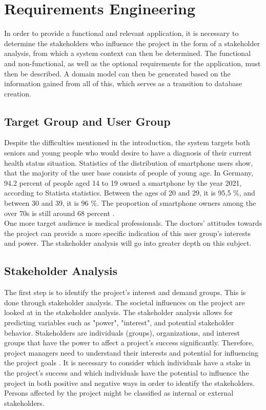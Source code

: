 
\chapter{Requirements Engineering}
In order to provide a functional and relevant application, it is necessary to determine the stakeholders who influence the project in the form of a stakeholder analysis, from which a system context can then be determined. The functional and non-functional, as well as the optional requirements for the application, must then be described. A domain model can then be generated based on the information gained from all of this, which serves as a transition to database creation.

\section{Target Group and User Group}
Despite the difficulties mentioned in the introduction, the system targets both seniors and young people who would desire to have a diagnosis of their current health status situation. Statistics of the distribution of smartphone users show, that the majority of the user base consists of people of young age. In Germany, 94.2 percent of people aged 14 to 19 owned a smartphone by the year 2021, according to Statista statistics. Between the ages of 20 and 29, it is 95,5 \%, and between 30 and 39, it is 96 \%. The proportion of smartphone owners among the over 70s is still around 68 percent \cite{.smartphonenutzer}.
\newline \\
One more target audience is medical professionals. The doctors' attitudes towards the project can provide a more specific indication of this user group's interests and power. The stakeholder analysis will go into greater depth on this subject. 

\section{Stakeholder Analysis}
The first step is to identify the project's interest and demand groups. This is done through stakeholder analysis. The societal influences on the project are looked at in the stakeholder analysis. The stakeholder analysis allows for predicting variables such as "power", "interest", and potential stakeholder behavior. Stakeholders are individuals (groups), organizations, and interest groups that have the power to affect a project's success significantly. Therefore, project managers need to understand their interests and potential for influencing the project goals \cite[p. 28]{.stakeholder}. It is necessary to consider which individuals have a stake in the project's success and which individuals have the potential to influence the project in both positive and negative ways in order to identify the stakeholders. Persons affected by the project might be classified as internal or external stakeholders. 

